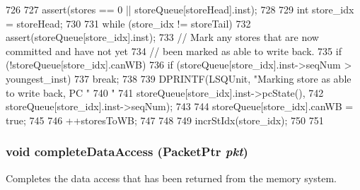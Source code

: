 \begin{DoxyCode}
726 {
727     assert(stores == 0 || storeQueue[storeHead].inst);
728 
729     int store_idx = storeHead;
730 
731     while (store_idx != storeTail) {
732         assert(storeQueue[store_idx].inst);
733         // Mark any stores that are now committed and have not yet
734         // been marked as able to write back.
735         if (!storeQueue[store_idx].canWB) {
736             if (storeQueue[store_idx].inst->seqNum > youngest_inst) {
737                 break;
738             }
739             DPRINTF(LSQUnit, "Marking store as able to write back, PC "
740                     "%
741                     storeQueue[store_idx].inst->pcState(),
742                     storeQueue[store_idx].inst->seqNum);
743 
744             storeQueue[store_idx].canWB = true;
745 
746             ++storesToWB;
747         }
748 
749         incrStIdx(store_idx);
750     }
751 }
\end{DoxyCode}
\hypertarget{classLSQUnit_a0f7f0d3412bbf494cd3d0c0f48e5fcf2}{
\subsubsection[{completeDataAccess}]{\setlength{\rightskip}{0pt plus 5cm}void completeDataAccess ({\bf PacketPtr} {\em pkt})}}
\label{classLSQUnit_a0f7f0d3412bbf494cd3d0c0f48e5fcf2}
Completes the data access that has been returned from the memory system. 


